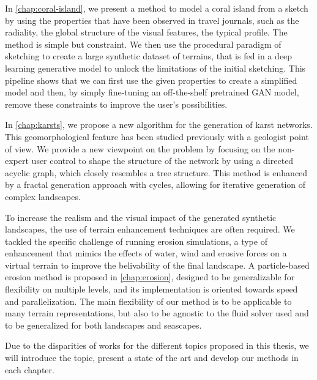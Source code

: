 In \cref{chap:coral-island}, we present a method to model a coral island from a sketch by using the properties that have been observed in travel journals, such as the radiality, the global structure of the visual features, the typical profile. The method is simple but constraint. We then use the procedural paradigm of sketching to create a large synthetic dataset of terrains, that is fed in a deep learning generative model to unlock the limitations of the initial sketching. This pipeline shows that we can first use the given properties to create a simplified model and then, by simply fine-tuning an off-the-shelf pretrained GAN model, remove these constraints to improve the user's possibilities.

In \cref{chap:karsts}, we propose a new algorithm for the generation of karst networks. This geomorphological feature has been studied previously with a geologist point of view. We provide a new viewpoint on the problem by focusing on the non-expert user control to shape the structure of the network by using a directed acyclic graph, which closely resembles a tree structure. This method is enhanced by a fractal generation approach with cycles, allowing for iterative generation of complex landscapes.

To increase the realism and the visual impact of the generated synthetic landscapes, the use of terrain enhancement techniques are often required. We tackled the specific challenge of running erosion simulations, a type of enhancement that mimics the effects of water, wind and erosive forces on a virtual terrain to improve the belivability of the final landscape. A particle-based erosion method is proposed in \cref{chap:erosion}, designed to be generalizable for flexibility on multiple levels, and its implementation is oriented towards speed and parallelization. The main flexibility of our method is to be applicable to many terrain representations, but also to be agnostic to the fluid solver used and to be generalized for both landscapes and seascapes.

Due to the disparities of works for the different topics proposed in this thesis, we will introduce the topic, present a state of the art and develop our methods in each chapter.





